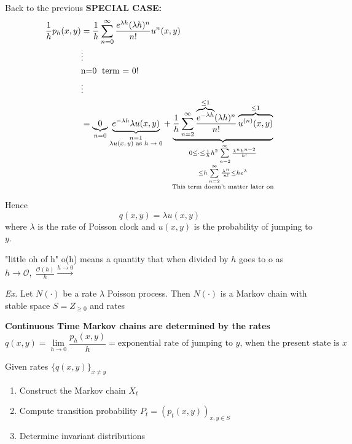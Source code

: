 \documentclass[12pt]{article}
\begin{document}
\vspace{1\baselineskip}
Back to the previous {\bf SPECIAL CASE:}
\begin{align}
    \frac{1}{h}p_h(x,y) &= \frac{1}{h} \sum\limits_{n=0}^\infty \frac{e^{\lambda h}(\lambda h)^n}{n!} u^n(x,y) \nonumber \\
    &\vdots \nonumber \\
    &\text{n=0\; term = 0!} \nonumber \\
    &\vdots \nonumber \\
    &=\underbrace{0}_{n=0} \underbrace{e^{-\lambda h}\lambda u(x,y)}_{\substack{{n=1}\\ \text{$\lambda u(x,y)$ as $h\to 0$}}} + \underbrace{\frac{1}{h} \sum\limits_{n=2}^\infty \frac{\overbrace{e^{-\lambda h}}^{\le 1}(\lambda h)^n}{n!} \overbrace{u^{(n)}(x,y)}^{\le 1}}_{\substack{{0\le \cdot \le \frac{1}{h}h^2\sum\limits_{n=2}^\infty \frac{\lambda^n h^{n-2}}{h!}}\\ {\le h \sum\limits_{n=2}^\infty \frac{\lambda^n}{n!} \le h e^\lambda}
    \\ \text{This term doesn't matter later on}}} \nonumber
\end{align}

\vspace{1\baselineskip}
Hence $$q(x,y)=\lambda u(x,y)$$ where $\lambda$ is the rate of Poisson clock and $u(x,y)$ is the probability of jumping to $y$.

\vspace{1\baselineskip}
"little oh of h" o(h) means a quantity that when divided by $h$ goes to o as $h\to \mathcal{O},\;\frac{\mathcal{O}(h)}{h}\xrightarrow{h\to 0}$

\vspace{1\baselineskip}
\rightarrow {}

\vspace{1\baselineskip}
{\sl Ex.} Let $N(\cdot)$ be a rate $\lambda$ Poisson process. Then $N(\cdot)$ is a Markov chain with stable space $S=Z_{\ge 0}$ and rates

\newpage
{\bf Continuous Time Markov chains are determined by the rates}
$$q(x,y) = \lim\limits_{h\to 0} \frac{p_h(x,y)}{h} = \text{exponential rate of jumping to $y$, when the present state is $x$}$$

\vspace{1\baselineskip}
Given rates $\{q(x,y)\}_{x\neq y}$
\begin{enumerate}
    \item Construct the Markov chain $X_t$
    \item Compute transition probability $P_t = (p_t(x,y))_{x,y\in S}$
    \item Determine invariant distributions
\end{enumerate}
\end{document}

